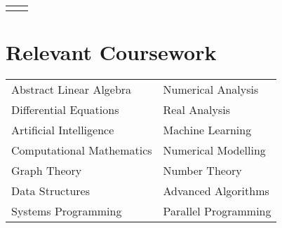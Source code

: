 \documentclass[10pt, oneside, openany]{article} %
\begin{document}
\begin{paracol}{2}
\begin{supertabular}{ll}
	
	
\end{supertabular}


\section{Relevant Coursework}

\begin{tabular}{l l}
Abstract Linear Algebra & Numerical Analysis\\
Differential Equations & Real Analysis\\
Artificial Intelligence & Machine Learning\\
Computational Mathematics & Numerical Modelling\\
Graph Theory & Number Theory\\
Data Structures & Advanced Algorithms\\
Systems Programming & Parallel Programming\\
\end{tabular}





\vspace{-\baselineskip}\medskip %

\switchcolumn %



\end{paracol}
\end{document}
